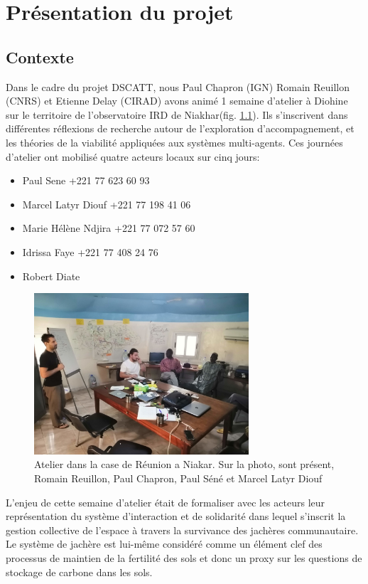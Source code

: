 \chapter{Présentation du projet}


\section{Contexte}

Dans le cadre du projet DSCATT, nous Paul Chapron (IGN) Romain Reuillon (CNRS) et Etienne Delay (CIRAD) avons animé 1 semaine d'atelier à Diohine sur le territoire de l'observatoire IRD de Niakhar(fig. \ref{fig:photoAtelier}). Ils s'inscrivent dans différentes réflexions de recherche autour de l'exploration d'accompagnement, et les théories de la viabilité appliquées aux systèmes multi-agents.
Ces journées d'atelier ont mobilisé quatre acteurs locaux sur cinq jours:
\begin{itemize}
  \item Paul Sene +221 77 623 60 93
  \item Marcel Latyr Diouf +221 77 198 41 06
  \item Marie Hélène Ndjira +221 77 072 57 60
  \item Idrissa Faye +221 77 408 24 76
  \item Robert Diate
\end{itemize}


\begin{figure}
  \begin{center}
    \includegraphics[width=8cm]{img/atelier_niakhar.jpg}
  \end{center}
  \caption{Atelier dans la case de Réunion a Niakar. Sur la photo, sont présent, Romain Reuillon, Paul Chapron, Paul Séné et Marcel Latyr Diouf}
  \label{fig:photoAtelier}
\end{figure}


L'enjeu de cette semaine d'atelier était de formaliser avec les acteurs leur représentation du système d'interaction et de solidarité dans lequel s'inscrit la gestion collective de l'espace à travers la survivance des jachères communautaire. Le système de jachère est lui-même considéré comme un élément clef des processus de maintien de la fertilité des sols et donc un proxy sur les questions de stockage de carbone dans les sols.

